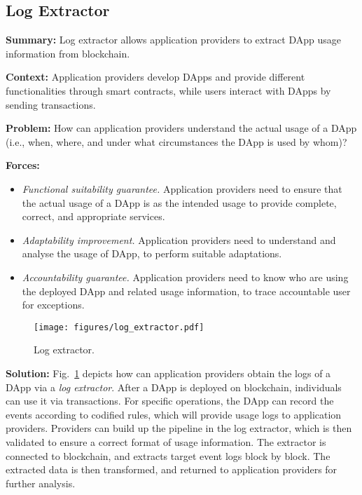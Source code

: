 \documentclass{article}
\begin{document}
\subsection{Log Extractor}

\vspace{0.5em}\noindent \textbf{Summary:} Log extractor allows application providers to extract DApp usage information from blockchain.

\vspace{0.5em}\noindent \textbf{Context:} Application providers develop DApps and provide different functionalities through smart contracts, while users interact with DApps by sending transactions.

\vspace{0.5em}\noindent \textbf{Problem:} How can application providers understand the actual usage of a DApp (i.e., when, where,
and under what circumstances the DApp is used by whom)?

\vspace{0.5em}\noindent \textbf{Forces:} 

\begin{itemize}
  \item \textit{Functional suitability guarantee.} Application providers need to ensure that the actual usage of a DApp is as the intended usage to provide complete, correct, and appropriate services.

  \item \textit{Adaptability improvement.} Application providers need to understand and analyse the usage of DApp, to perform suitable adaptations.
  
  \item \textit{Accountability guarantee.} Application providers need to know who are using the deployed DApp and related usage information, to trace accountable user for exceptions.
\end{itemize}

\begin{figure}[!ht]
	\centering
	\texttt{[image: figures/log\_extractor.pdf]}
	\caption{Log extractor.}
	\label{pic:log_extractor}
\end{figure}

\vspace{0.5em}\noindent \textbf{Solution:} Fig.~\ref{pic:log_extractor} depicts how can application providers obtain the logs of a DApp via a \textit{log extractor}. After a DApp is deployed on blockchain, individuals can use it via transactions. For specific operations, the DApp can record the events according to codified rules, which will provide usage logs to application providers. Providers can build up the pipeline in the log extractor, which is then validated to ensure a correct format of usage information. The extractor is connected to blockchain, and extracts target event logs block by block. The extracted data is then transformed, and returned to application providers for further analysis.
\end{document}

